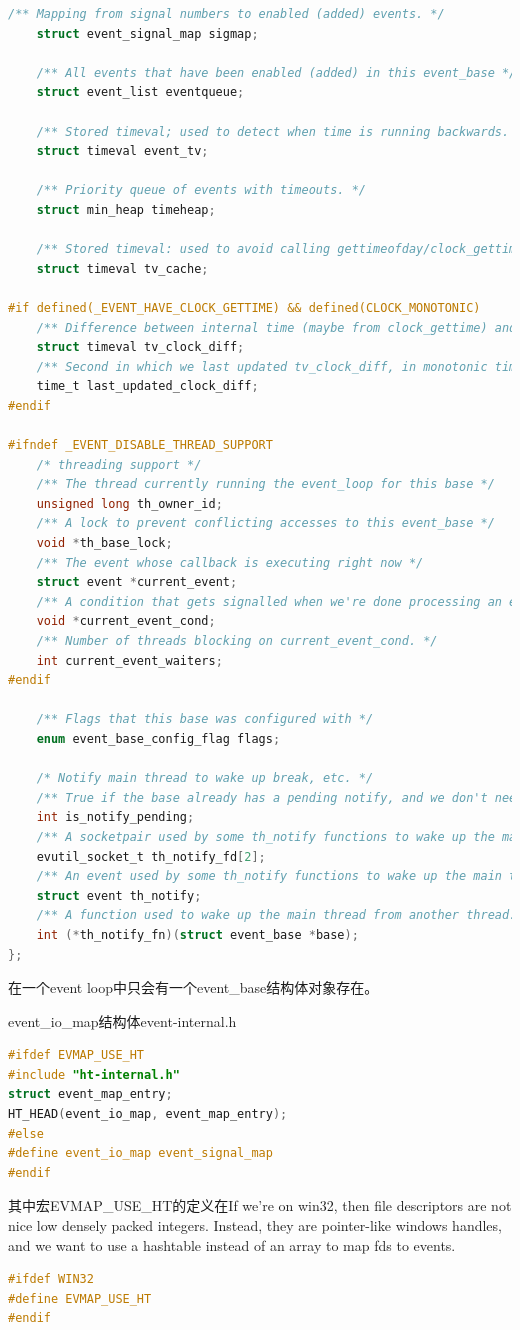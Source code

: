 \documentclass[11pt,a4paper]{article}
\begin{document}
\begin{lstlisting}[language=C]
	/** Mapping from signal numbers to enabled (added) events. */
	struct event_signal_map sigmap;

	/** All events that have been enabled (added) in this event_base */
	struct event_list eventqueue;

	/** Stored timeval; used to detect when time is running backwards. */
	struct timeval event_tv;

	/** Priority queue of events with timeouts. */
	struct min_heap timeheap;

	/** Stored timeval: used to avoid calling gettimeofday/clock_gettime too often. */
	struct timeval tv_cache;

#if defined(_EVENT_HAVE_CLOCK_GETTIME) && defined(CLOCK_MONOTONIC)
	/** Difference between internal time (maybe from clock_gettime) and gettimeofday. */
	struct timeval tv_clock_diff;
	/** Second in which we last updated tv_clock_diff, in monotonic time. */
	time_t last_updated_clock_diff;
#endif

#ifndef _EVENT_DISABLE_THREAD_SUPPORT
	/* threading support */
	/** The thread currently running the event_loop for this base */
	unsigned long th_owner_id;
	/** A lock to prevent conflicting accesses to this event_base */
	void *th_base_lock;
	/** The event whose callback is executing right now */
	struct event *current_event;
	/** A condition that gets signalled when we're done processing an event with waiters on it. */
	void *current_event_cond;
	/** Number of threads blocking on current_event_cond. */
	int current_event_waiters;
#endif

	/** Flags that this base was configured with */
	enum event_base_config_flag flags;

	/* Notify main thread to wake up break, etc. */
	/** True if the base already has a pending notify, and we don't need to add any more. */
	int is_notify_pending;
	/** A socketpair used by some th_notify functions to wake up the main thread. */
	evutil_socket_t th_notify_fd[2];
	/** An event used by some th_notify functions to wake up the main thread. */
	struct event th_notify;
	/** A function used to wake up the main thread from another thread. */
	int (*th_notify_fn)(struct event_base *base);
};
\end{lstlisting}
在一个event loop中只会有一个event\_base结构体对象存在。

event\_io\_map结构体event-internal.h
\begin{lstlisting}[language=C]
#ifdef EVMAP_USE_HT
#include "ht-internal.h"
struct event_map_entry;
HT_HEAD(event_io_map, event_map_entry);
#else
#define event_io_map event_signal_map
#endif
\end{lstlisting}
其中宏EVMAP\_USE\_HT的定义在If we're on win32, then file descriptors are not nice low densely packed integers.  Instead, they are pointer-like windows handles, and we want to use a hashtable instead of an array to map fds to events.
\begin{lstlisting}[language=C]
#ifdef WIN32
#define EVMAP_USE_HT
#endif
\end{lstlisting}
\end{document}
